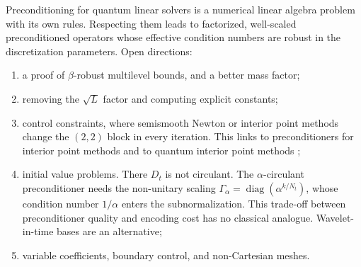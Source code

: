 \documentclass[11pt,a4paper]{article}
\theoremstyle{remark}
\begin{document}
Preconditioning for quantum linear solvers is a numerical linear algebra
problem with its own rules. Respecting them leads to factorized,
well-scaled preconditioned operators whose effective condition numbers
are robust in the discretization parameters. Open directions:
\begin{enumerate}
\item a proof of $\beta$-robust multilevel bounds, and a better mass factor;
\item removing the $\sqrt L$ factor and computing explicit constants;
\item control constraints, where semismooth Newton or interior point
  methods change the $(2,2)$ block in every iteration. This links to
  preconditioners for interior point methods and to quantum interior point
  methods \cite{QIPMreview};
\item initial value problems. There $D_t$ is not circulant. The
  $\alpha$-circulant preconditioner \cite{MPW18} needs the non-unitary scaling
  $\Gamma_\alpha=\operatorname{diag}(\alpha^{k/N_t})$, whose condition number $1/\alpha$ enters the
  subnormalization. This trade-off between preconditioner quality and
  encoding cost has no classical analogue. Wavelet-in-time bases
  \cite{SS09} are an alternative;
\item variable coefficients, boundary control, and non-Cartesian meshes.
\end{enumerate}
\end{document}

